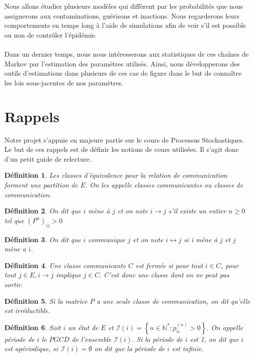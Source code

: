 \documentclass[12pt,a4paper]{report}
\newtheorem{definition}{Définition}[section]
\theoremstyle{remark}
\begin{document}
\\
\\
Nous allons étudier plusieurs modèles qui diffèrent par les probabilités que nous assignerons aux contaminations, guérisons et inactions. Nous regarderons leurs comportements en temps long à l'aide de simulations afin de voir s'il est possible ou non de contrôler l'épidémie.
\\
\\
Dans un dernier temps, nous nous intéresserons aux statistiques de ces chaînes de Markov par l'estimation des paramètres utilisés. Ainsi, nous développerons des outils d'estimations dans plusieurs de ces cas de figure dans le but de connaître les lois sous-jacentes de nos paramètres. 

\newpage
\chapter*{Rappels}
Notre projet s'appuie en majeure partie sur le cours de Processus Stochastiques. Le but de ces rappels est de définir les notions de cours utilisées. Il s'agit donc d'un petit guide de relecture.
\vspace{1cm}\\
\begin{definition}\label{def}
Les classes d'équivalence pour la relation de communication forment une partition de $E .$ On les appelle classes communicantes ou classes de communication.
\end{definition}
\begin{definition}\label{defa}
On dit que $i$ mène à $j$ et on note $i \longrightarrow j$ s'il existe un entier $n \geq 0$ tel que $\left(P^{n}\right)_{i j}>0$
\end{definition}
\begin{definition}\label{defb}
On dit que $i$ communique $j$ et on note $i \leftrightarrow j$ si i mène à $j$ et $j$ mène a $i$.
\end{definition}
\begin{definition}\label{def0}
Une classe communicante $C$ est fermée si pour tout $i \in C$, pour tout $j \in E, i \rightarrow j$ implique $j \in C .$ C'est donc une classe dont on ne peut pas sortir.
\end{definition}
\begin{definition}\label{defa0}
Si la matrice $P$ a une seule classe de communication, on dit qu'elle est irréductible.
\end{definition}
\begin{definition}\label{def00}
Soit $i$ un état de $E$ et $\mathcal{I}(i)=\left\{n \in \mathbb{N}^{*} ; p_{i i}^{(n)}>0\right\} .$ On appelle période de $i$ le $P G C D$ de l'ensemble $\mathcal{I}(i) .$ Si la période de $i$ est 1, on dit que $i$ est apériodique, $s i$ $\mathcal{I}(i)=\emptyset$ on dit que la période de $i$ est infinie.
\end{definition}
\end{document}

